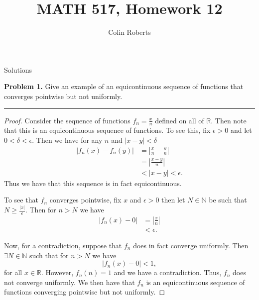 \documentclass[leqno]{article}
\author{Colin Roberts}
\title{MATH 517, Homework 12}
\theoremstyle{nonumberplain}
\newtheorem{proof}{Proof}
\newcommand{\R}{\mathbb{R}}
\newcommand{\N}{\mathbb{N}}
\begin{document}
\maketitle
\begin{large}
\begin{center}
Solutions
\end{center}
\end{large}
\pagebreak


\noindent\textbf{Problem 1.} Give an example of an equicontinuous sequence of functions that converges pointwise but not
uniformly.

\noindent\rule[0.5ex]{\linewidth}{1pt}

\begin{proof}
Consider the sequence of functions $f_n = \frac{x}{n}$ defined on all of $\R$. Then note that this is an equicontinuous sequence of functions.  To see this, fix $\epsilon>0$ and let $0<\delta<\epsilon$.  Then we have for any $n$ and $|x-y|<\delta$
\begin{align*}
|f_n(x)-f_n(y)|&=\left| \frac{x}{n}-\frac{y}{n} \right|\\
&= \left| \frac{x-y}{n} \right|\\
&< |x-y|<\epsilon.
\end{align*}
Thus we have that this sequence is in fact equicontinuous.

To see that $f_n$ converges pointwise, fix $x$ and $\epsilon>0$ then let $N\in \N$ be such that $N\geq \frac{|x|}{\epsilon}$. Then for $n>N$ we have
\begin{align*}
|f_n(x)-0|&=\left| \frac{x}{n}\right|\\
&<\epsilon.
\end{align*}

Now, for a contradiction, suppose that $f_n$ does in fact converge uniformly.  Then $\exists N\in \N$ such that for $n>N$ we have 
\[
|f_n(x)-0|<1,
\]
for all $x\in \R$. However, $f_n(n)=1$ and we have a contradiction.  Thus, $f_n$ does not converge uniformly.  We then have that $f_n$ is an equicontinuous sequence of functions converging pointwise but not uniformly.
\end{proof}
\end{document}

